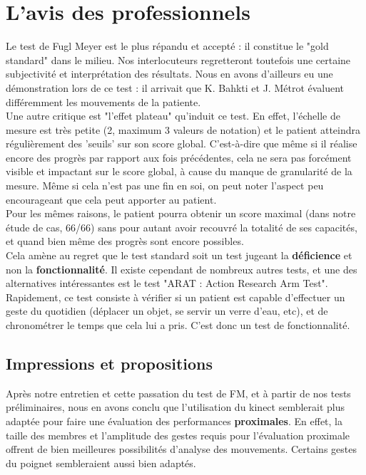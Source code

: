   \section{L'avis des professionnels}
  Le test de Fugl Meyer est le plus répandu et accepté : il constitue le "gold standard" dans le milieu.
  Nos interlocuteurs regretteront toutefois une certaine subjectivité et interprétation des résultats.
  Nous en avons d'ailleurs eu une démonstration lors de ce test : il arrivait que K. Bahkti et J. Métrot 
  évaluent différemment les mouvements de la patiente. \\
Une autre critique est "l'effet plateau" qu'induit ce test. En effet, l'échelle de mesure est très petite 
(2, maximum 3 valeurs de notation) et le patient atteindra régulièrement des 'seuils' sur son score global. 
C'est-à-dire que même si il réalise encore des progrès par rapport aux fois précédentes, cela ne sera pas forcément 
visible et impactant sur le score global, à cause du manque de granularité de la mesure. Même si cela n'est pas une 
fin en soi, on peut noter l'aspect peu encourageant que cela peut apporter au patient. \\
Pour les mêmes raisons, le patient pourra obtenir un score maximal (dans notre étude de cas, 66/66) sans pour autant
avoir recouvré la totalité de ses capacités, et quand bien même des progrès sont encore possibles. \\
Cela amène au regret que le test standard soit un test jugeant la \textbf{déficience} et non la \textbf{fonctionnalité}. 
Il existe cependant de nombreux autres tests, et une des alternatives intéressantes est le test "ARAT : 
Action Research Arm Test". %
Rapidement, ce test consiste à vérifier si un patient est capable d'effectuer un geste du quotidien (déplacer
un objet, se servir un verre d'eau, etc), et de chronométrer le temps que cela lui a pris. C'est donc un test 
de fonctionnalité.
  
  \subsection{Impressions et propositions}
Après notre entretien et cette passation du test de FM, et à partir de nos tests préliminaires, nous en avons 
conclu que l'utilisation du kinect semblerait plus adaptée pour faire une évaluation des performances \textbf{proximales}.
En effet, la taille des membres et l'amplitude des gestes requis pour l'évaluation proximale offrent de bien 
meilleures possibilités d'analyse des mouvements. Certains gestes du poignet sembleraient aussi bien adaptés.
